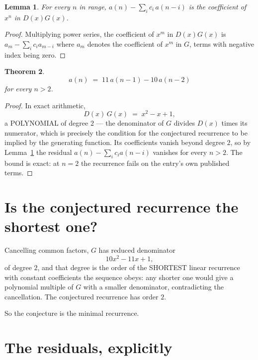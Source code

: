 \documentclass[11pt,a4paper]{article}
\theoremstyle{plain}
\newtheorem{theorem}{Theorem}
\newtheorem{lemma}[theorem]{Lemma}
\theoremstyle{definition}
\begin{document}
\begin{lemma}\label{lem:key}
For every $n$ in range, $a(n)-\sum_i c_i\,a(n-i)$ is the coefficient of $x^{n}$ in
$D(x)G(x)$.
\end{lemma}

\begin{proof}
Multiplying power series, the coefficient of $x^{m}$ in $D(x)G(x)$ is
$a_m-\sum_i c_i a_{m-i}$ where $a_m$ denotes the coefficient of $x^{m}$ in $G$, terms with
negative index being zero.
\end{proof}

\begin{theorem}
\[
a(n)\;=\;11\,a(n-1) - 10\,a(n-2)
\]
for every $n>2$.
\end{theorem}

\begin{proof}
In exact arithmetic,
\[
D(x)\,G(x)\;=\;x^{2} - x + 1,
\]
a POLYNOMIAL of degree $2$ --- the denominator of $G$ divides $D(x)$ times its numerator,
which is precisely the condition for the conjectured recurrence to be implied by the
generating function. Its coefficients vanish beyond degree $2$, so by
Lemma~\ref{lem:key} the residual $a(n)-\sum_ic_ia(n-i)$ vanishes for every
$n>2$. The bound is exact: at $n=2$ the recurrence fails on the entry's own published terms.
\end{proof}

\section{Is the conjectured recurrence the shortest one?}

Cancelling common factors, $G$ has reduced denominator
\[
10 x^{2} - 11 x + 1,
\]
of degree $2$, and that degree is the order of the SHORTEST linear recurrence with
constant coefficients the sequence obeys: any shorter one would give a polynomial multiple of
$G$ with a smaller denominator, contradicting the cancellation. The conjectured recurrence has
order $2$.

So the conjecture is the minimal recurrence.

\section{The residuals, explicitly}
\end{document}
